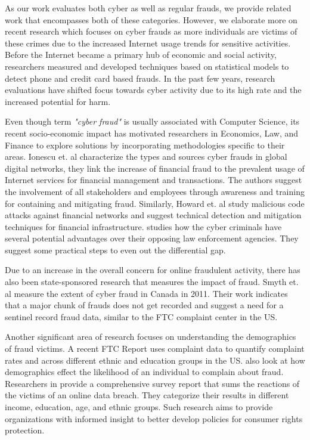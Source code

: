 \documentclass[conference]{IEEEtran}
\begin{document}
As our work evaluates both cyber as well as regular frauds, we provide related work that encompasses both of these categories. However, we elaborate more on recent research which focuses on cyber frauds as more individuals are victims of these crimes \cite{anderson2013consumer} due to the increased Internet usage trends for sensitive activities. Before the Internet became a primary hub of economic and social activity, researchers measured \cite{clarke2001controlling} and developed techniques based on statistical models \cite{brause1999neural, moreau1997detection, bolton2002statistical, snyder2015no} to detect phone and credit card based frauds. In the past few years,  research evaluations have shifted focus towards cyber activity \cite{ablon2016consumer, piper2002, ionescu2011fraud, howard2007cyber} due to its high rate and the increased potential for harm.

Even though term \emph{"cyber fraud"} is usually associated with Computer Science, its recent socio-economic impact has motivated researchers in Economics, Law, and Finance to explore solutions by incorporating methodologies specific to their areas. Ionescu et. al \cite{ionescu2011fraud} characterize the types and sources cyber frauds in global digital networks, they link the increase of financial fraud to the prevalent usage of Internet services for financial management and transactions. The authors suggest the involvement of all stakeholders and employees through awareness and training for containing and mitigating fraud. Similarly, Howard et. al \cite{howard2007cyber} study malicious code attacks against financial networks and suggest technical detection and mitigation techniques for financial infrastructure. \cite{piper2002} studies how the cyber criminals have several potential advantages over their opposing law enforcement agencies. They suggest some practical steps to even out the differential gap.

Due to an increase in the overall concern for online fraudulent activity, there has also been state-sponsored research that measures the impact of fraud. Smyth et. al \cite{smyth2011measuring} measure the extent of cyber fraud in Canada in 2011. Their work indicates that a major chunk of frauds does not get recorded and suggest a need for a sentinel record fraud data, similar to the FTC complaint center in the US.

Another significant area of research focuses on understanding the demographics of fraud victims. A recent FTC Report \cite{raval2016determines} uses complaint data to quantify complaint rates and across different ethnic and education groups in the US. \cite{garrett2010consumers} also look at how demographics effect the likelihood of an individual to complain about fraud. Researchers in \cite{ablon2016consumer} provide a comprehensive survey report that sums the reactions of the victims of an online data breach. They categorize their results in different income, education, age, and ethnic groups. Such research aims to provide organizations with informed insight to better develop policies for consumer rights protection.
\end{document}
